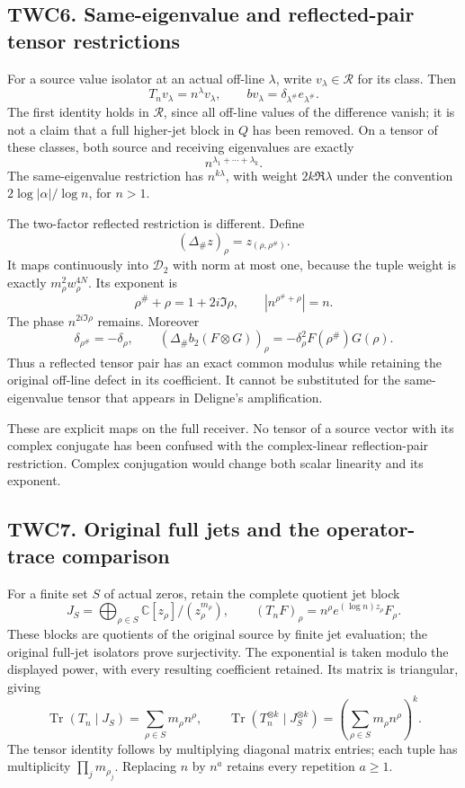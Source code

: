 \subsection{TWC6. Same-eigenvalue and reflected-pair tensor
restrictions}\label{twc6.-same-eigenvalue-and-reflected-pair-tensor-restrictions}

For a source value isolator at an actual off-line \(\lambda\), write
\(v_\lambda\in\mathcal R\) for its class. Then \[
T_nv_\lambda=n^\lambda v_\lambda,\qquad
b v_\lambda=\delta_{\lambda^\#}e_{\lambda^\#}.
\tag{TWC6.1}
\] The first identity holds in \(\mathcal R\), since all off-line values
of the difference vanish; it is not a claim that a full higher-jet block
in \(Q\) has been removed. On a tensor of these classes, both source and
receiving eigenvalues are exactly \[
n^{\lambda_1+\cdots+\lambda_k}.
\tag{TWC6.2}
\] The same-eigenvalue restriction has \(n^{k\lambda}\), with weight
\(2k\Re\lambda\) under the convention \(2\log|\alpha|/\log n\), for
\(n>1\).

The two-factor reflected restriction is different. Define \[
(\Delta_\#z)_\rho=z_{(\rho,\rho^\#)}.
\tag{TWC6.3}
\] It maps continuously into \(\mathscr D_2\) with norm at most one,
because the tuple weight is exactly \(m_\rho^2w_\rho^{4N}\). Its
exponent is \[
\rho^\#+\rho=1+2i\Im\rho,
\qquad|n^{\rho^\#+\rho}|=n.
\tag{TWC6.4}
\] The phase \(n^{2i\Im\rho}\) remains. Moreover \[
\delta_{\rho^\#}=-\delta_\rho,\qquad
(\Delta_\# b_2(F\otimes G))_\rho
=-\delta_\rho^2 F(\rho^\#)G(\rho).
\tag{TWC6.5}
\] Thus a reflected tensor pair has an exact common modulus while
retaining the original off-line defect in its coefficient. It cannot be
substituted for the same-eigenvalue tensor that appears in Deligne's
amplification.

These are explicit maps on the full receiver. No tensor of a source
vector with its complex conjugate has been confused with the
complex-linear reflection-pair restriction. Complex conjugation would
change both scalar linearity and its exponent.

\subsection{TWC7. Original full jets and the operator-trace
comparison}\label{twc7.-original-full-jets-and-the-operator-trace-comparison}

For a finite set \(S\) of actual zeros, retain the complete quotient jet
block \[
J_S=\bigoplus_{\rho\in S}\mathbb C[z_\rho]/(z_\rho^{m_\rho}),
\qquad (T_nF)_\rho=n^\rho e^{(\log n)z_\rho}F_\rho.
\tag{TWC7.1}
\] These blocks are quotients of the original source by finite jet
evaluation; the original full-jet isolators prove surjectivity. The
exponential is taken modulo the displayed power, with every resulting
coefficient retained. Its matrix is triangular, giving \[
\operatorname{Tr}(T_n\mid J_S)=\sum_{\rho\in S}m_\rho n^\rho,
\qquad
\operatorname{Tr}(T_n^{\otimes k}\mid J_S^{\otimes k})
=\left(\sum_{\rho\in S}m_\rho n^\rho\right)^k.
\tag{TWC7.2}
\] The tensor identity follows by multiplying diagonal matrix entries;
each tuple has multiplicity \(\prod_jm_{\rho_j}\). Replacing \(n\) by
\(n^a\) retains every repetition \(a\ge1\).

